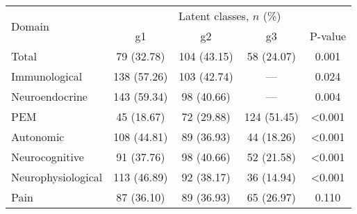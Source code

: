 \begin{tabular}{lcccc} 
\toprule
\multirow{2}{*}{Domain} & \multicolumn{4}{c}{Latent classes, $n$ (\%)}                                                        \\ 
\cmidrule{2-5}
                        & g1          & g2         & g3         & P-value  \\ 
\midrule
Total                   & 79 (32.78)  & 104 (43.15) & 58 (24.07)  & 0.001 \\
Immunological           & 138 (57.26) & 103 (42.74) & ---         & 0.024 \\
Neuroendocrine          & 143 (59.34) & 98 (40.66)  & ---         & 0.004 \\
PEM                     & 45 (18.67)  & 72 (29.88)  & 124 (51.45) & <0.001 \\
Autonomic               & 108 (44.81) & 89 (36.93)  & 44 (18.26)  & <0.001 \\
Neurocognitive          & 91 (37.76)  & 98 (40.66)  & 52 (21.58)  & <0.001 \\
Neurophysiological      & 113 (46.89) & 92 (38.17)  & 36 (14.94)  & <0.001 \\
Pain                    & 87 (36.10)  & 89 (36.93)  & 65 (26.97)  & 0.110 \\
\bottomrule
\end{tabular}